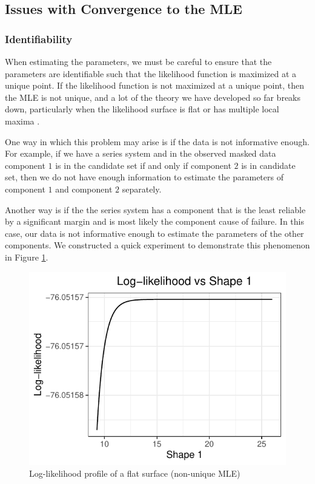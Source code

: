 \documentclass[
]{article}
\begin{document}
\hypertarget{sec:opt_rescale}{%
\subsection{Issues with Convergence to the MLE}\label{sec:opt_rescale}}

\hypertarget{identifiability}{%
\subsubsection*{Identifiability}\label{identifiability}}

When estimating the parameters, we must be careful to ensure that the
parameters are identifiable such that the likelihood function is
maximized at a unique point. If the likelihood function is not maximized
at a unique point, then the MLE is not unique, and a lot of the theory
we have developed so far breaks down, particularly when the likelihood
surface is flat or has multiple local maxima
\citep{mclachlan2007algorithm}.

One way in which this problem may arise is if the data is not
informative enough. For example, if we have a series system and in the
observed masked data component \(1\) is in the candidate set if and only
if component \(2\) is in candidate set, then we do not have enough
information to estimate the parameters of component \(1\) and component
\(2\) separately.

Another way is if the the series system has a component that is the
least reliable by a significant margin and is most likely the component
cause of failure. In this case, our data is not informative enough to
estimate the parameters of the other components. We constructed a quick
experiment to demonstrate this phenomenon in Figure
\ref{fig:flat-loglike-prof}.

\begin{figure}

{\centering \includegraphics{image/last_plot} 

}

\caption{Log-likelihood profile of a flat surface (non-unique MLE)}\label{fig:flat-loglike-prof}
\end{figure}
\end{document}
